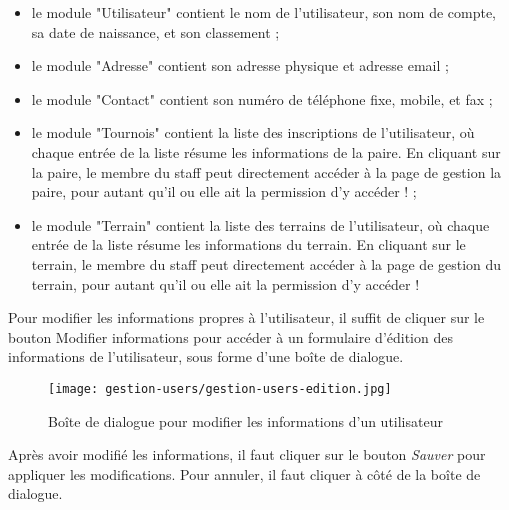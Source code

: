 \begin{itemize}
\item le module "Utilisateur" contient le nom de l'utilisateur, son nom de compte, sa date de naissance, et son classement ;
\item le module "Adresse" contient son adresse physique et adresse email ;
\item le module "Contact" contient son numéro de téléphone fixe, mobile, et fax ;
\item le module "Tournois" contient la liste des inscriptions de l'utilisateur, où chaque entrée de la liste résume les informations de la paire. En cliquant sur la paire, le membre du staff peut directement accéder à la page de gestion la paire, pour autant qu'il ou elle ait la permission d'y accéder ! ;
\item le module "Terrain" contient la liste des terrains de l'utilisateur, où chaque entrée de la liste résume les informations du terrain. En cliquant sur le terrain, le membre du staff peut directement accéder à la page de gestion du terrain, pour autant qu'il ou elle ait la permission d'y accéder !
\end{itemize}
\bigskip

Pour modifier les informations propres à l'utilisateur, il suffit de cliquer sur le bouton Modifier informations pour accéder à un formulaire d'édition des informations de l'utilisateur, sous forme d'une boîte de dialogue.

\begin{figure}[H]
\centering
\texttt{[image: gestion-users/gestion-users-edition.jpg]}
\caption{Boîte de dialogue pour modifier les informations d'un utilisateur}
\end{figure}

Après avoir modifié les informations, il faut cliquer sur le bouton \textit{Sauver} pour appliquer les modifications. Pour annuler, il faut cliquer à côté de la boîte de dialogue.
